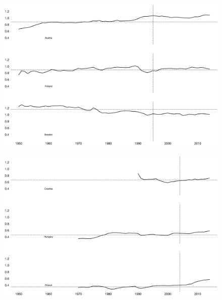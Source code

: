 \documentclass{beamer}
\begin{document}
\begin{frame}
  \begin{figure}
    \includegraphics[scale=.3]{enlargement3.eps}
  \end{figure}
\end{frame}

\begin{frame}
  \begin{figure}
    \includegraphics[scale=.3]{enlargement4.eps}
  \end{figure}
\end{frame}
\end{document}
